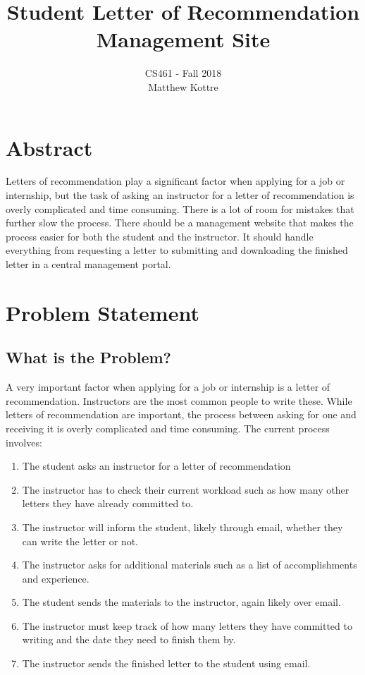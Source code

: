 \documentclass[draftclsnofoot,onecolumn]{IEEEtran}
\title{Student Letter of Recommendation Management Site}
\author{CS461 - Fall 2018 \\ Matthew Kottre}
\begin{document}
\maketitle

\section{Abstract}
Letters of recommendation play a significant factor when applying for a job or internship, but the task of asking an instructor for a letter of recommendation is overly complicated and time consuming. There is a lot of room for mistakes that further slow the process. There should be a management website that makes the process easier for both the student and the instructor. It should handle everything from requesting a letter to submitting and downloading the finished letter in a central management portal.

\pagebreak

\section{Problem Statement}
\subsection{What is the Problem?}
A very important factor when applying for a job or internship is a letter of recommendation. Instructors are the most common people to write these. While letters of recommendation are important, the process between asking for one and receiving it is overly complicated and time consuming. The current process involves:
\begin{enumerate}
    \item The student asks an instructor for a letter of recommendation
    \item The instructor has to check their current workload such as how many other letters they have already committed to.
    \item The instructor will inform the student, likely through email, whether they can write the letter or not.
    \item The instructor asks for additional materials such as a list of accomplishments and experience.
    \item The student sends the materials to the instructor, again likely over email.
    \item The instructor must keep track of how many letters they have committed to writing and the date they need to finish them by.
    \item The instructor sends the finished letter to the student using email.
\end{enumerate}
\end{document}

